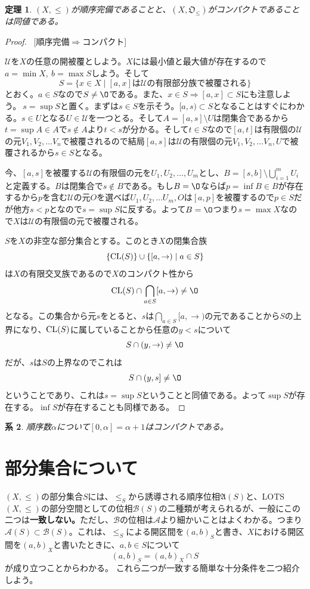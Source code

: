 \documentclass[leqno]{jsarticle}
\newtheorem{thm}{定理}
\newtheorem{cor}[thm]{系}
\newcommand{\To}{\Longrightarrow}
\newcommand{\dpst}{\displaystyle}
\newcommand{\al}{\alpha}
\newcommand{\cl}{\text{{\rm CL}}}
\begin{document}
\begin{thm}
$(X,\le)$が順序完備であることと、$(X,\mathfrak{O}_{\le})$がコンパクトであることは同値である。
\end{thm}
\begin{proof}\ 
[順序完備$\To$コンパクト]\par
$\mathcal{U}$を$X$の任意の開被覆としよう。$X$には最小値と最大値が存在するので$a=\min X,\ b=\max S$しよう。そして
\[
S=\{x\in X\mid \text{$[a,x]$は$\mathcal{U}$の有限部分族で被覆される}\}
\]
とおく。$a\in S$なので$S\neq \O$である。また、$x\in S\To [a,x]\subset S$にも注意しよう。$\ s=\sup S$と置く。まずは$s\in S$を示そう。$[a,s)\subset S$となることはすぐにわかる。$s\in U$となる$U\in \mathcal{U}$を一つとる。そして$A=[a,s]\setminus U$は閉集合であるから$t=\sup A\in A$で$s\not\in A$より$t<s$が分かる。そして$t\in S$なので$[a,t]$は有限個の$\mathcal{U}$の元$V_1,V_2,\dots V_n$で被覆されるので結局$[a,s]$は$\mathcal{U}$の有限個の元$V_1,V_2,\dots V_n,U$で被覆されるから$s\in S$となる。\par
今、$[a,s]$を被覆する$\mathcal{U}$の有限個の元を$U_1,U_2,\dots,U_m$とし、$B=[s,b]\setminus \bigcup_{i=1}^mU_i$と定義する。$B$は閉集合で$s\notin B$である。もし$B=\O$ならば$p=\inf B\in B$が存在するから$p$を含む$\mathcal{U}$の元$O$を選べば$U_1,U_2,\dots U_m, O$は$[a,p]$を被覆するので$p\in S$だが他方$s<p$となので$s=\sup S$に反する。よって$B=\O$つまり$s=\max X$なので$X$は$\mathcal{U}$の有限個の元で被覆される。\par
[コンパクト$\To$順序完備]
$S$を$X$の非空な部分集合とする。このとき$X$の閉集合族
\[
\{\cl(S)\}\cup\{[a,\to)\mid a\in S\}
\]
は$X$の有限交叉族であるので$X$のコンパクト性から
\[
\cl(S)\cap \bigcap_{a\in S} [a,\to)\neq \O
\]
となる。この集合から元$s$をとると、$s$は$\dpst \bigcap_{a\in S} [a,\to)$の元であることから$S$の上界になり、$\cl(S)$に属していることから任意の$y<s$について
\[
S\cap (y,\to)\neq\O
\]
だが、$s$は$S$の上界なのでこれは
\[
S\cap (y,s]\neq \O
\]
ということであり、これは$s=\sup S$ということと同値である。よって$\sup S$が存在する。$\inf S$が存在することも同様である。
\end{proof}

\begin{cor}
順序数$\al$について$[0,\al]=\al+1$はコンパクトである。
\end{cor}

\section{部分集合について}
$(X,\le)$の部分集合$S$には、$\le_S$から誘導される順序位相$\mathfrak{A}(S)$と、LOTS$(X,\le)$の部分空間としての位相$\mathcal{B}(S)$の二種類が考えられるが、一般にこの二つは\textbf{一致しない。}ただし、$\mathcal{B}$の位相は$\mathcal{A}$より細かいことはよくわかる。つまり$\mathcal{A}(S)\subset \mathcal{B}(S)$。これは、$\le_S$による開区間を$(a,b)_{S}$と書き、$X$における開区間を$(a,b)_{X}$と書いたときに、$a,b\in S$について
\[
(a,b)_S=(a,b)_X\cap S
\]
が成り立つことからわかる。
これら二つが一致する簡単な十分条件を二つ紹介しよう。
\end{document}
